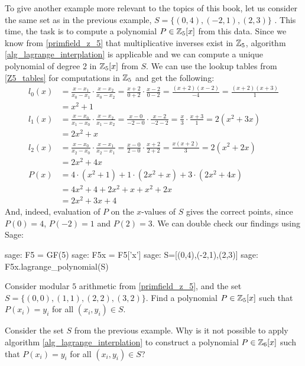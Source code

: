 \begin{example} To give another example more relevant to the topics of this book, let us consider the same set as in the previous example, $S=\{(0,4),(-2,1),(2,3)\}$ . This time, the task is to compute a polynomial $P\in\mathbb{Z}_5[x]$ from this data. Since we know
from \examplename{} \ref{primfield_z_5} that multiplicative inverses exist in $\mathbb{Z}_5$, algorithm \ref{alg_lagrange_interplation} is applicable and we can compute a unique polynomial of degree 2 in $\mathbb{Z}_5[x]$ from $S$. We can use the lookup tables from  \eqref{Z5_tables} for computations in $\mathbb{Z}_5$ and get the following:
\begin{align*}
l_0(x) & = \frac{x-x_1}{x_0-x_1}\cdot\frac{x-x_2}{x_0-x_2}
         = \frac{x+2}{0+2}\cdot\frac{x-2}{0-2}
         =  \frac{(x+2)(x-2)}{-4}
         =  \frac{(x+2)(x+3)}{1}\\
       & =  x^2+1\\
l_1(x) & =  \frac{x-x_0}{x_1-x_0}\cdot\frac{x-x_2}{x_1-x_2}
         = \frac{x-0}{-2-0}\cdot \frac{x-2}{-2-2}
         = \frac{x}{3}\cdot \frac{x+3}{1}
         = 2(x^2+3x)\\
       & =  2x^2+x\\
l_2(x) & = \frac{x-x_0}{x_2-x_0}\cdot\frac{x-x_1}{x_2-x_1}
         = \frac{x-0}{2-0}\cdot\frac{x+2}{2+2}
         = \frac{x(x+2)}{3}
         = 2(x^2+2x)\\
       & = 2x^2+4x\\
P(x)   & = 4\cdot (x^2+1) + 1\cdot (2x^2+x) + 3\cdot (2x^2+4x) \\
       & = 4x^2+4 + 2x^2 +x + x^2+2x\\
       & = 2x^2 +3x +4
\end{align*}
And, indeed, evaluation of $P$ on the $x$-values of $S$ gives the correct points, since $P(0)=4$, $P(-2)=1$ and $P(2)=3$. We can double check our findings using  Sage:
\begin{sagecommandline}
sage: F5 = GF(5)
sage: F5x = F5['x']
sage: S=[(0,4),(-2,1),(2,3)]
sage: F5x.lagrange_polynomial(S)
\end{sagecommandline}
\end{example}
\begin{exercise}
Consider modular $5$ arithmetic from \examplename{} \ref{primfield_z_5}, and the set
$S=\{(0,0),(1,1),(2,2),(3,2)\}$. Find a polynomial $P\in\mathbb{Z}_5[x]$ such that $P(x_i)=y_i$ for all $(x_i,y_i)\in S$.
\end{exercise}
\begin{exercise}
Consider the set $S$ from the previous example. Why is it not possible to apply algorithm \ref{alg_lagrange_interplation} to construct a polynomial $P\in \mathbb{Z}_6[x]$  such that $P(x_i)=y_i$ for all $(x_i,y_i)\in S$?
\end{exercise}
